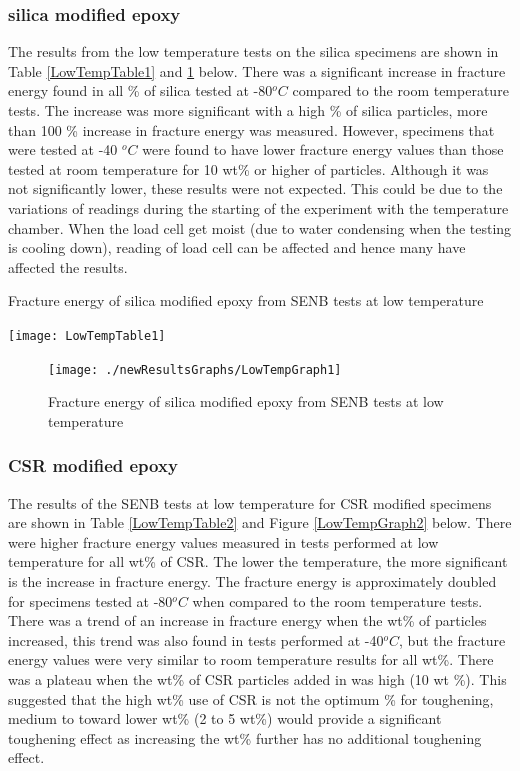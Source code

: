\documentclass[numbers=noendperiod,chapterprefix=on]{icldt} %
\begin{document}
\subsubsection{silica modified epoxy}
The results from the low temperature tests on the silica specimens are shown in Table \ref{LowTempTable1} and \ref{LowTempGraph1} below.
There was a significant increase in fracture energy found in all \% of silica tested at -80$^oC$ compared to the room temperature tests. The increase was more significant with a high \% of silica particles, more than 100 \% increase in fracture energy was measured. However, specimens that were tested at -40 $^oC$ were found to have lower fracture energy values than those tested at room temperature for 10 wt\% or higher of particles. Although it was not significantly lower, these results were not expected. This could be due to the variations of readings during the starting of the experiment with the temperature chamber. When the load cell get moist (due to water condensing when the testing is cooling down), reading of load cell can be affected and hence many have affected the results.

\begin{table}[!t]
\centering
\caption{Fracture energy of silica modified epoxy from SENB tests at low temperature} \label{LowTempTable1}
\texttt{[image: LowTempTable1]}
\end{table}
\FloatBarrier

\begin{figure}[!h]
\centering
\texttt{[image: ./newResultsGraphs/LowTempGraph1]}
\caption{Fracture energy of silica modified epoxy from SENB tests at low temperature}\label{LowTempGraph1}
\end{figure}
\FloatBarrier

\subsubsection{CSR modified epoxy}
The results of the SENB tests at low temperature for CSR modified specimens are shown in Table \ref{LowTempTable2} and Figure \ref{LowTempGraph2} below.
There were higher fracture energy values measured in tests performed at low temperature for all wt\% of CSR. The lower the temperature, the more significant is the increase in fracture energy. The fracture energy is approximately doubled for specimens tested at -80$^oC$ when compared to the room temperature tests. There was a trend of an increase in fracture energy when the wt\% of particles increased, this trend was also found in tests performed at -40$^oC$, but the fracture energy values were very similar to room temperature results for all wt\%. 
 There was a plateau when the wt\% of CSR particles added in was high (10 wt \%). This suggested that the high wt\% use of CSR is not the optimum \% for toughening, medium to toward lower wt\% (2 to 5 wt\%) would provide a significant toughening effect as increasing the wt\% further has no additional toughening effect.
\end{document}
